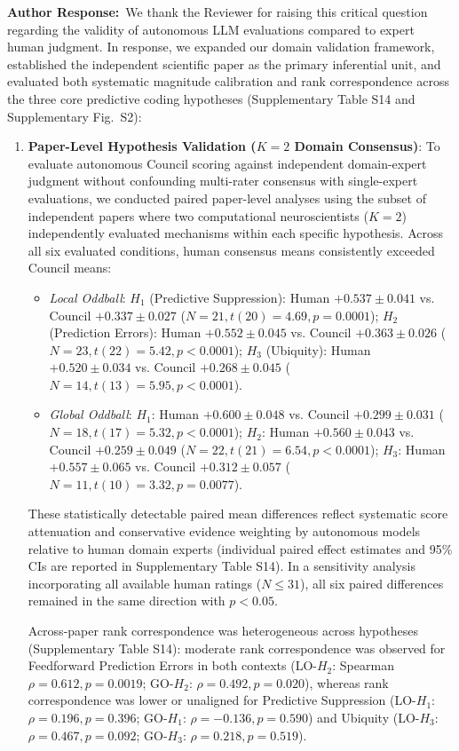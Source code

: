 \documentclass[11pt]{article}
\newcommand{\authorsresponse}{\noindent\textbf{\color{black}Author Response:}\ }
\begin{document}
\authorsresponse We thank the Reviewer for raising this critical question regarding the validity of autonomous LLM evaluations compared to expert human judgment. In response, we expanded our domain validation framework, established the independent scientific paper as the primary inferential unit, and evaluated both systematic magnitude calibration and rank correspondence across the three core predictive coding hypotheses (Supplementary Table S14 and Supplementary Fig.~S2):
\begin{enumerate}[leftmargin=*,noitemsep]
\item \textbf{Paper-Level Hypothesis Validation ($K=2$ Domain Consensus)}: 
To evaluate autonomous Council scoring against independent domain-expert judgment without confounding multi-rater consensus with single-expert evaluations, we conducted paired paper-level analyses using the subset of independent papers where two computational neuroscientists ($K=2$) independently evaluated mechanisms within each specific hypothesis. Across all six evaluated conditions, human consensus means consistently exceeded Council means:
\begin{itemize}[leftmargin=*,noitemsep]
\item \emph{Local Oddball}: $H_1$ (Predictive Suppression): Human $+0.537 \pm 0.041$ vs. Council $+0.337 \pm 0.027$ ($N=21, t(20)=4.69, p=0.0001$); $H_2$ (Prediction Errors): Human $+0.552 \pm 0.045$ vs. Council $+0.363 \pm 0.026$ ($N=23, t(22)=5.42, p < 0.0001$); $H_3$ (Ubiquity): Human $+0.520 \pm 0.034$ vs. Council $+0.268 \pm 0.045$ ($N=14, t(13)=5.95, p < 0.0001$).
\item \emph{Global Oddball}: $H_1$: Human $+0.600 \pm 0.048$ vs. Council $+0.299 \pm 0.031$ ($N=18, t(17)=5.32, p < 0.0001$); $H_2$: Human $+0.560 \pm 0.043$ vs. Council $+0.259 \pm 0.049$ ($N=22, t(21)=6.54, p < 0.0001$); $H_3$: Human $+0.557 \pm 0.065$ vs. Council $+0.312 \pm 0.057$ ($N=11, t(10)=3.32, p=0.0077$).
\end{itemize}
These statistically detectable paired mean differences reflect systematic score attenuation and conservative evidence weighting by autonomous models relative to human domain experts (individual paired effect estimates and 95\% CIs are reported in Supplementary Table S14). In a sensitivity analysis incorporating all available human ratings ($N \le 31$), all six paired differences remained in the same direction with $p < 0.05$. 

Across-paper rank correspondence was heterogeneous across hypotheses (Supplementary Table S14): moderate rank correspondence was observed for Feedforward Prediction Errors in both contexts (LO-$H_2$: Spearman $\rho = 0.612, p = 0.0019$; GO-$H_2$: $\rho = 0.492, p = 0.020$), whereas rank correspondence was lower or unaligned for Predictive Suppression (LO-$H_1$: $\rho = 0.196, p = 0.396$; GO-$H_1$: $\rho = -0.136, p = 0.590$) and Ubiquity (LO-$H_3$: $\rho = 0.467, p = 0.092$; GO-$H_3$: $\rho = 0.218, p = 0.519$).


\end{enumerate}
\end{document}
